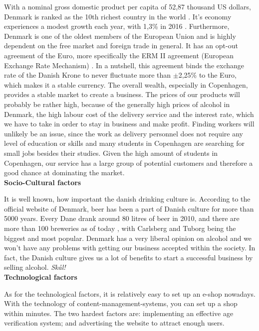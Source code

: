 \documentclass[12p]{article}
\begin{document}
With a nominal gross domestic product per capita of 52,87 thousand US dollars, Denmark is ranked as the 10th richest country in the world \cite{PEST_NominalGDPPerCapita}. It's economy experiences a modest growth each year, with 1,3\% in 2016 \cite{PEST_CIAFactbookDenmark}. Furthermore, Denmark is one of the oldest members of the European Union and is highly dependent on the free market and foreign trade in general. It has an opt-out agreement of the Euro, more specifically the ERM II agreement (European Exchange Rate Mechanism) \cite{PEST_ERM2}. In a nutshell, this agreement binds the exchange rate of the Danish Krone to never fluctuate more than $\pm$2,25\% to the Euro, which makes it a stable currency. The overall wealth, especially in Copenhagen, provides a stable market to create a business. The prices of our products will probably be rather high, because of the generally high prices of alcohol in Denmark, the high labour cost of the delivery service and the interest rate, which we have to take in order to stay in business and make profit. Finding workers will unlikely be an issue, since the work as delivery personnel does not require any level of education or skills and many students in Copenhagen are searching for small jobs besides their studies. Given the high amount of students in Copenhagen, our service has a large group of potential customers and therefore a good chance at dominating the market. \\

\newpage %
\textbf{Socio-Cultural factors}

It is well known, how important the danish drinking culture is. According to the official website of Denmark, beer has been a part of Danish culture for more than 5000 years. Every Dane drank around 80 litres of beer in 2010, and there are more than 100 breweries as of today \cite{PEST_BeerInDenmark}, with Carlsberg and Tuborg being the biggest and most popular. Denmark has a very liberal opinion on alcohol and we won't have any problems with getting our business accepted within the society. In fact, the Danish culture gives us a lot of benefits to start a successful business by selling alcohol. \emph{Skål!} \\

\textbf{Technological factors}

As for the technological factors, it is relatively easy to set up an e-shop nowadays. With the technology of content-management-systems, you can set up a shop within minutes. The two hardest factors are: implementing an effective age verification system; and advertising the website to attract enough users. \\
\end{document}
